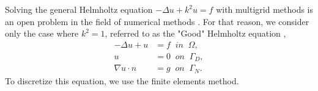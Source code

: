 \documentclass[]{article}
\begin{document}
Solving the general Helmholtz equation $-\Delta u +k^2 u = f$ with multigrid methods is an open problem in the field of numerical methods \cite{Ernst2012}.  For that reason, we consider only the case where $k^2=1$, referred to as the "Good" Helmholtz equation \cite{Farrell2018},
\begin{align}
-\Delta u + u &= f \;\; in \;\; \Omega, \\
u &= 0 \;\; on \;\; \Gamma_D, \\
\nabla u\cdot n &= g \;\; on \;\; \Gamma_N.
\end{align}
To discretize this equation, we use the finite elements method.


\printbibliography 


%
%
\end{document}
